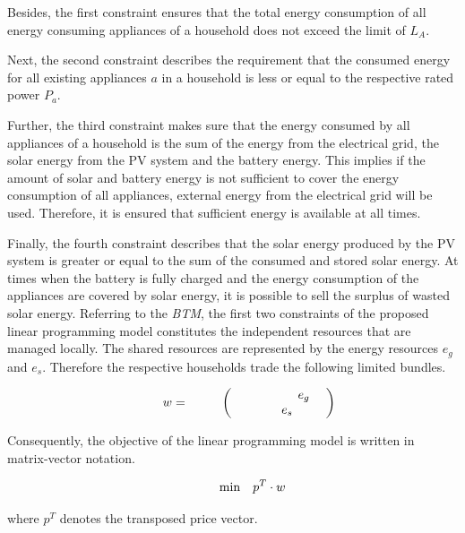 Besides, the first constraint ensures that the total energy consumption of all energy consuming
appliances of a household does not exceed the limit of $L_{A}$. 

Next, the second constraint describes the requirement that the consumed energy
for all existing appliances $a$ in a household is less or equal 
to the respective rated power $P_{a}$.

Further, the third constraint makes sure that the energy consumed by all appliances
of a household is the sum of the energy from the electrical grid, the solar energy from the PV system and the battery energy. This implies if the amount of solar and battery energy is not sufficient to cover the energy consumption of all appliances, external energy from the electrical grid will be used. Therefore, it is ensured that sufficient energy is available at all times.

Finally, the fourth constraint describes that the solar energy produced by the PV system is greater or equal to the sum of the consumed and stored solar energy. 
At times when the battery is fully charged and the energy consumption of the 
appliances are covered by solar energy, it is possible to sell the surplus of 
wasted solar energy.
Referring to the \textit{BTM}, the first two constraints of the proposed linear
programming model constitutes the independent resources that are managed locally.
The shared resources are represented by 
the energy resources $e_{g}$ and $e_{s}$.
Therefore the respective households trade the following limited bundles.

\begin{equation*}
 \begin{array}{ll@{}ll}
        w = 
        \begin{pmatrix}
            e_{g} \\
            e_{s}
        \end{pmatrix}
 \end{array}
\end{equation*}

Consequently, the objective of the linear programming 
model is written in matrix-vector notation.

\begin{equation*}
 \begin{array}{ll@{}ll}
        \text{min} & \displaystyle p^{T} \cdot w
 \end{array}
\end{equation*}

where $p^{T}$ denotes the transposed price vector.


